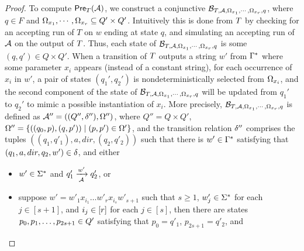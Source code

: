 \begin{proof}
To compute $\textsf{Pre}_{T}(\mathcal{A})$, we construct a conjunctive \FFA{} %
$\mathcal{B}_{T, \mathcal{A}, \Omega_{x_1}, \cdots, \Omega_{x_r}, q}$, %
%
where  $q \in F$ and  $\Omega_{x_1}, \cdots, \Omega_{x_r} \subseteq Q' \times Q'$.   
Intuitively this is done from $T$  by checking for an accepting run of $T$ on $w$ ending at state $q$, and simulating an accepting run of $\mathcal{A}$ on the output of $T$. Thus, each state of $\mathcal{B}_{T, \mathcal{A}, \Omega_{x_1}, \cdots, \Omega_{x_r}, q}$ is some $(q,q') \in Q \times Q'$. 
When a transition of $T$ outputs a string $w'$ from $\Gamma^*$ where some parameter $x_i$ appears (instead of a constant string), for each occurrence of $x_i$ in $w'$, a pair of states $(q_1', q_2')$ is nondeterministically selected from $\Omega_{x_i}$, and the second component of the state of $\mathcal{B}_{T, \mathcal{A}, \Omega_{x_1}, \cdots, \Omega_{x_r}, q}$ will be updated from $q_1'$ to $q_2'$ to mimic a possible instantiation of $x_i$.  
More precisely, $\mathcal{B}_{T, \mathcal{A}, \Omega_{x_1}, \cdots, \Omega_{x_r}, q}$ is defined as
$\mathcal{A}'' = ((Q'', \delta''), \Omega'')$, where $Q'' = Q \times Q'$, $\Omega'' = \{((q_0, p), (q, p')) \mid (p, p') \in \Omega'\}$, and the transition relation $\delta''$ comprises the tuples $((q_1, q'_1), a, dir, (q_2, q'_2))$ such that there is $w' \in \Gamma^*$ satisfying that $(q_1, a, dir, q_2, w') \in \delta$, and either
\begin{itemize}
\item $w' \in \Sigma^*$  and $q'_1 \xrightarrow[\mathcal{A}]{w'} q'_2$, or
%
\item suppose $w' = w'_1 x_{i_1} \ldots w'_{r} x_{i_{s}} w'_{s+1}$ such that $s \ge 1$, $w'_j \in \Sigma^*$ for each $j \in [s+1]$,  and $i_j \in [r]$ for each $j \in [s]$, then there are states $p_0, p_1, \ldots, p_{2s+1} \in Q'$ satisfying that $p_0 = q'_1$, $p_{2s+1} = q'_2$, and 

\end{itemize}
\end{proof}
